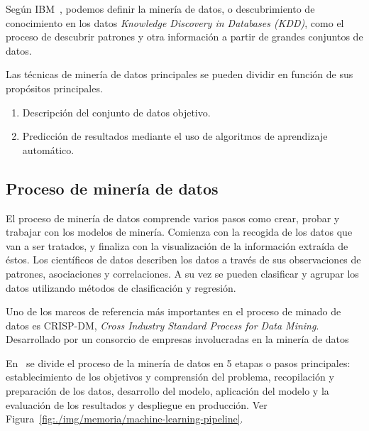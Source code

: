 Según IBM~\cite{IBM-WhatisDataMining}, podemos definir la minería de datos, o descubrimiento de conocimiento
en los datos \textit{Knowledge Discovery in Databases (KDD)}, como el proceso de descubrir patrones y otra
información a partir de grandes conjuntos de datos. 

Las técnicas de minería de datos principales se pueden dividir en función de sus propósitos principales.
\begin{enumerate}
    \item Descripción del conjunto de datos objetivo.
    \item Predicción de resultados mediante el uso de algoritmos de aprendizaje automático.
\end{enumerate}

\subsection{Proceso de minería de datos}
El proceso de minería de datos comprende varios pasos como crear, probar y trabajar con los modelos de minería. Comienza con la recogida de los datos que van a ser tratados, y finaliza con la visualización de la información extraída de éstos. 
Los científicos de datos describen los datos a través de sus observaciones de patrones, asociaciones y correlaciones. A su vez se pueden clasificar y agrupar los datos utilizando métodos de clasificación y regresión.

Uno de los marcos de referencia más importantes en el proceso de minado de datos es CRISP-DM, \textit{Cross Industry Standard Process for Data Mining}. Desarrollado por un consorcio de empresas involucradas en la minería de datos~\cite{Chapman2000CRISPDM1S}


En~\cite{KOTU201517} se divide el proceso de la minería de datos en 5 etapas o pasos principales: establecimiento de los objetivos y comprensión del problema, recopilación y preparación de los datos, desarrollo del modelo, aplicación del modelo y la evaluación de los resultados y despliegue en producción. Ver Figura~\ref{fig:./img/memoria/machine-learning-pipeline}.


